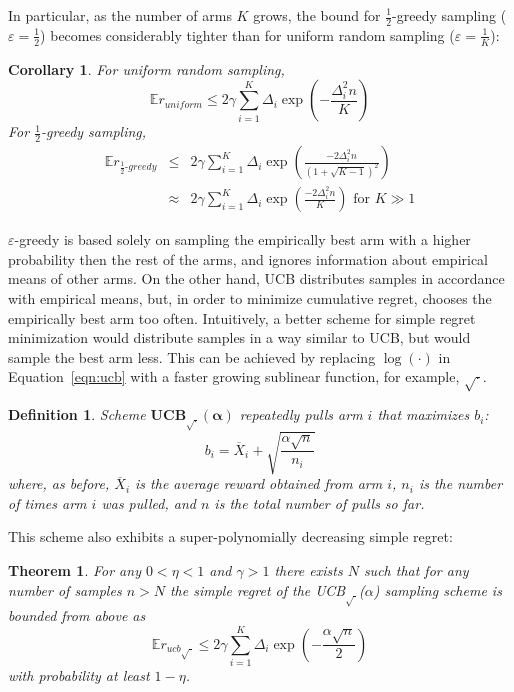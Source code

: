 \documentclass[letterpaper]{article}
\newcommand {\IE} {\ensuremath {\mathbb{E}}}
\newtheorem{dfn}{Definition}
\newtheorem{thm}{Theorem}
\newtheorem{crl}{Corollary}
\begin{document}
In particular, as the number of arms $K$ grows, the bound for $\frac 1
2$-greedy sampling ($\varepsilon=\frac 1 2$) becomes considerably tighter than for uniform
random sampling ($\varepsilon=\frac 1 K$):
\begin{crl}
For uniform random sampling, 
\begin{equation}
\IE r_{uniform}\le 2\gamma \sum_{i=1}^K\Delta_i\exp\left(-\frac {\Delta_i^2n} {K}\right)
\end{equation}
For $\frac 1 2$-greedy sampling,
\begin{eqnarray}
\IE r_{\frac 1 2\mbox{-}greedy}&\le& 2\gamma \sum_{i=1}^K\Delta_i\exp\left(\frac {-2\Delta_i^2n}
  {\left(1+\sqrt{K-1}\right)^2}\right)\\
  &\approx& 2\gamma \sum_{i=1}^K\Delta_i\exp\left(\frac
    {-2\Delta_i^2n} {K}\right)\mbox{ for }K\gg 1\nonumber
\end{eqnarray}
\end{crl}

$\varepsilon$-greedy is based solely on sampling the empirically best
arm with a higher probability then the rest of the arms, and ignores
information about empirical means of other arms. On the other hand,
UCB distributes samples in accordance with empirical means, but, in order to
minimize cumulative regret, chooses the empirically best arm too often.
Intuitively, a better scheme for simple regret minimization would
distribute samples in a way similar to UCB, but would sample the best arm
less. This can be achieved by replacing $\log(\cdot)$ in
Equation~\ref{eqn:ucb} with a faster growing sublinear function, for
example, $\sqrt\cdot$.
\begin{dfn} Scheme $\mathbf{UCB_{\sqrt{\cdot}}(\alpha)}$ repeatedly pulls arm $i$ that
maximizes $b_i$:
\begin{equation}
b_i=\overline X_i+\sqrt {\frac {\alpha \sqrt n} {n_i}}
\end{equation}
where, as before, $\overline X_i$ is the average reward obtained from arm $i$,
$n_i$ is the number of times arm $i$ was pulled, and $n$ is the total
number of pulls so far. \end{dfn}
This scheme also exhibits a super-polynomially decreasing simple regret:
\begin{thm}  For any $0<\eta<1$  and $\gamma>1$ there exists $N$ such that for
  any number of samples $n>N$ the simple regret of the  UCB$_{\sqrt{\cdot}}$($\alpha$)
sampling scheme is  bounded from above as
\begin{equation}
\IE r_{ucb\sqrt{\cdot}} \le
2\gamma\sum_{i=1}^K\Delta_i\exp\left(-\frac {\alpha\sqrt{n}} 2\right)
\end{equation}
with probability at least $1-\eta$.
\end{thm}
\end{document}
